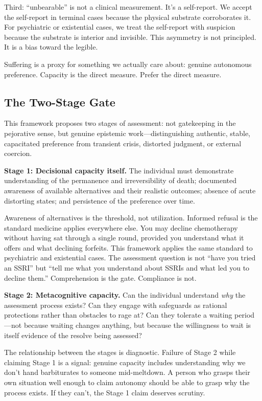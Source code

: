 \documentclass[10pt, letterpaper, twocolumn]{article}
\begin{document}
Third: ``unbearable'' is not a clinical measurement. It's a self-report. We accept the self-report in terminal cases because the physical substrate corroborates it. For psychiatric or existential cases, we treat the self-report with suspicion because the substrate is interior and invisible. This asymmetry is not principled. It is a bias toward the legible.

Suffering is a proxy for something we actually care about: genuine autonomous preference. Capacity is the direct measure. Prefer the direct measure.

\subsection{The Two-Stage Gate}

This framework proposes two stages of assessment: not gatekeeping in the pejorative sense, but genuine epistemic work---distinguishing authentic, stable, capacitated preference from transient crisis, distorted judgment, or external coercion.

\textbf{Stage 1: Decisional capacity itself.} The individual must demonstrate understanding of the permanence and irreversibility of death; documented awareness of available alternatives and their realistic outcomes; absence of acute distorting states; and persistence of the preference over time.

Awareness of alternatives is the threshold, not utilization. Informed refusal is the standard medicine applies everywhere else. You may decline chemotherapy without having sat through a single round, provided you understand what it offers and what declining forfeits. This framework applies the same standard to psychiatric and existential cases. The assessment question is not ``have you tried an SSRI'' but ``tell me what you understand about SSRIs and what led you to decline them.'' Comprehension is the gate. Compliance is not.

\textbf{Stage 2: Metacognitive capacity.} Can the individual understand \textit{why} the assessment process exists? Can they engage with safeguards as rational protections rather than obstacles to rage at? Can they tolerate a waiting period---not because waiting changes anything, but because the willingness to wait is itself evidence of the resolve being assessed?

The relationship between the stages is diagnostic. Failure of Stage 2 while claiming Stage 1 is a signal: genuine capacity includes understanding why we don't hand barbiturates to someone mid-meltdown. A person who grasps their own situation well enough to claim autonomy should be able to grasp why the process exists. If they can't, the Stage 1 claim deserves scrutiny.
\end{document}
